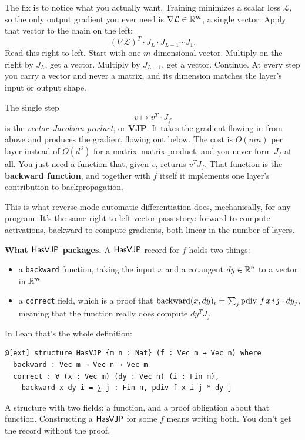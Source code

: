 The fix is to notice what you actually want. Training minimizes a
scalar loss $\mathcal{L}$, so the only output gradient you ever need
is $\nabla \mathcal{L} \in \mathbb{R}^{m}$, a single vector. Apply that
vector to the chain on the left:
\[
  (\nabla \mathcal{L})^T \cdot J_L \cdot J_{L-1} \cdots J_1.
\]
Read this right-to-left. Start with one $m$-dimensional vector.
Multiply on the right by $J_L$, get a vector. Multiply by $J_{L-1}$,
get a vector. Continue. At every step you carry a vector and never a
matrix, and its dimension matches the layer's input or output
shape.

The single step
\[
  v \mapsto v^T \cdot J_f
\]
is the \emph{vector--Jacobian product}, or \textbf{VJP}. It takes the
gradient flowing in from above and produces the gradient flowing out
below. The cost is $O(mn)$ per layer instead of $O(d^3)$ for a
matrix--matrix product, and you never form $J_f$ at all. You just
need a function that, given $v$, returns $v^T J_f$. That function
is the \textbf{backward function}, and together with $f$ itself it
implements one layer's contribution to backpropagation.

This is what reverse-mode automatic differentiation does, mechanically,
for any program. It's the same right-to-left vector-pass story: forward
to compute activations, backward to compute gradients, both linear in
the number of layers.

\textbf{What \(\mathsf{HasVJP}\) packages.} A \(\mathsf{HasVJP}\) record for $f$ holds
two things:
\begin{itemize}
  \item a \texttt{backward} function, taking the input $x$ and a
  cotangent $dy \in \mathbb{R}^{n}$ to a vector in $\mathbb{R}^{m}$
  \item a \texttt{correct} field, which is a proof that
  $\mathrm{backward}(x, dy)_i = \sum_j \operatorname{pdiv}\, f\, x\, i\, j \cdot dy_j$,
  meaning that the function really does compute $dy^T J_f$
\end{itemize}
In Lean that's the whole definition:
\begin{verbatim}
@[ext] structure HasVJP {m n : Nat} (f : Vec m → Vec n) where
  backward : Vec m → Vec n → Vec m
  correct : ∀ (x : Vec m) (dy : Vec n) (i : Fin m),
    backward x dy i = ∑ j : Fin n, pdiv f x i j * dy j
\end{verbatim}
A structure with two fields: a function, and a proof obligation about
that function. Constructing a \(\mathsf{HasVJP}\) for some $f$ means writing
both. You don't get the record without the proof.

